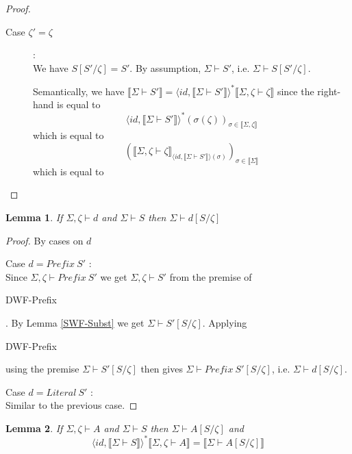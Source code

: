 \documentclass{article}
\newtheorem{lemma}{Lemma}
\newcommand{\sem}[1]{\llbracket #1 \rrbracket}
\begin{document}
\begin{proof}
\begin{description}
\begin{description}
\item[Case $\zeta' = \zeta$]:\\
We have $S[S'/\zeta] = S'$. By assumption, $\Sigma \vdash S'$, i.e. $\Sigma \vdash S[S'/\zeta]$.

Semantically, we have $\sem{\Sigma \vdash S'} = \langle \mathit{id}, \sem{\Sigma \vdash S'} \rangle^* \sem{\Sigma,\zeta \vdash \zeta}$ since the right-hand is equal to $$\langle \mathit{id}, \sem{\Sigma \vdash S'} \rangle^* (\sigma(\zeta))_{\sigma \in \sem{\Sigma,\zeta}}$$
which is equal to
$$( \sem{\Sigma,\zeta \vdash \zeta}_{\langle \mathit{id}, \sem{\Sigma \vdash S'} \rangle(\sigma)} )_{\sigma \in \sem{\Sigma}}$$
which is equal to
$$ $$
\end{description}

\end{description}

\end{proof}

\begin{lemma}
If $\Sigma,\zeta \vdash d$ and $\Sigma \vdash S$ then $\Sigma \vdash d[S/\zeta]$
\label{DWF-Subst}
\end{lemma}

\begin{proof}
By cases on $d$

\item[Case $d = \mathit{Prefix}~S'$]:\\
Since $\Sigma,\zeta \vdash \mathit{Prefix}~S'$ we get $\Sigma,\zeta \vdash S'$ from the premise of 
\begin{sc}DWF-Prefix\end{sc}. By Lemma \ref{SWF-Subst} we get $\Sigma \vdash S'[S/\zeta]$. Applying
\begin{sc}DWF-Prefix\end{sc} using the premise $\Sigma \vdash S'[S/\zeta]$ then gives $\Sigma \vdash \mathit{Prefix}~S'[S/\zeta]$, i.e. $\Sigma \vdash d[S/\zeta]$.

\item[Case $d = \mathit{Literal}~S'$]:\\
Similar to the previous case.

\end{proof}

\begin{lemma}
If $\Sigma,\zeta \vdash A$ and $\Sigma \vdash S$ then $\Sigma \vdash A[S/\zeta]$ and
$$\langle \mathit{id}, \sem{\Sigma \vdash S} \rangle^* \sem{\Sigma, \zeta \vdash A} = \sem{\Sigma \vdash A[S/\zeta]}$$
\end{lemma}
\end{document}
